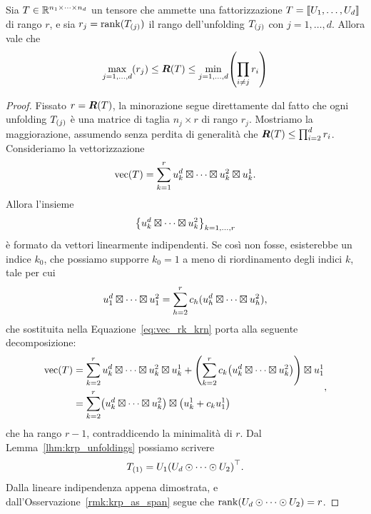 \begin{proposition}
	\label{th:rank}
	Sia $ T \in \Rmsiz! $ un tensore che ammette una fattorizzazione $ T = \dsqr{U_1, \ldots,
			U_d} $ di rango $ r $, e sia $ r_j = \rank(\Tm{T}{j}) $ il rango dell'unfolding $ \Tm{T}{j} $ con $ j = 1, \ldots, d $. Allora vale che
	\begin{equation}
		\max_{j=1, \ldots, d}(r_j) \le \rk(T) \le \min_{j=1, \ldots, d}\left( \prod_{i \neq j}r_i \right)
	\end{equation}
\end{proposition}
\begin{proof}
	Fissato $ r = \bm{R}(T) $, la minorazione segue direttamente dal fatto che ogni unfolding $ \Tm{T}{j}
	$ è una matrice di taglia $ n_{j} \times r  $ di rango $ r_{j} $.
	Mostriamo la maggiorazione, assumendo senza perdita di generalità che $ \bm{R}(T) \le
		\prod_{i=2}^d r_i $. Consideriamo la vettorizzazione
	\begin{equation}
		\label{eq:vec_rk_krn}
		\operatorname{vec}(T) = \sum_{k=1}^r u_k^d \mathbin{\boxtimes} \cdots \mathbin{\boxtimes} u_k^2 \mathbin{\boxtimes} u_k^1.
	\end{equation}
	Allora l'insieme
	\[
		\left\{u_k^d \krn \cdots \krn u_k^2\right\}_{k = 1, \ldots, r}
	\] è formato da vettori linearmente indipendenti. Se così non fosse,
	esisterebbe un indice $ k_0 $, che possiamo supporre $ k_0 = 1 $ a meno di riordinamento degli
	indici $ k $, tale per cui
	\begin{equation}
		u_{1}^d \mathbin{\boxtimes} \cdots \mathbin{\boxtimes} u_{1}^2 = \sum_{h = 2}^r c_h(u_h^d \mathbin{\boxtimes} \cdots \mathbin{\boxtimes} u_h^2),
	\end{equation}
	che sostituita nella Equazione~\eqref{eq:vec_rk_krn} porta alla seguente decomposizione:
	\begin{equation*}
		\begin{aligned}
			\Vec(T) & = \sum_{k=2}^r u_k^d \krn \cdots \krn u_k^2 \krn u_k^1 + \left(\sum_{k=2}^r c_k
			\left(u_k^d \krn \cdots \krn u_k^2\right) \right) \krn u_1^1                              \\
			        & = \sum_{k=2}^r \left(u_k^d \krn \cdots \krn u_k^2\right)
			\krn \left(u_k^1 + c_k u_1^1\right)
		\end{aligned},
	\end{equation*}
	che ha rango $ r-1 $, contraddicendo la minimalità di $ r $.
	Dal Lemma~\ref{lhm:krp_unfoldings} possiamo scrivere
	\[
		\Tm{T}{1} = U_1 \left( U_d \krp \cdots \krp U_2 \right)^{\top}.
	\] Dalla lineare indipendenza appena dimostrata, e
	dall'Osservazione~\ref{rmk:krp_as_span} segue che $ \rank \left(U_d \krp \cdots \krp U_2 \right) =r $.

\end{proof}
